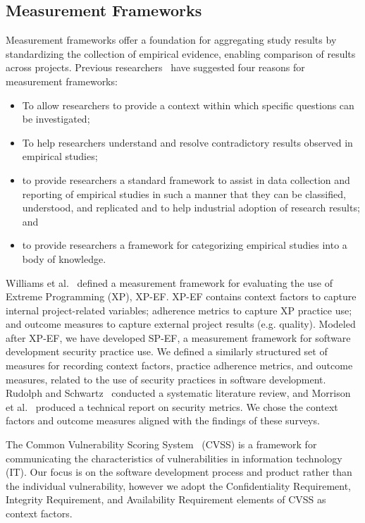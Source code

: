 \subsection{Measurement Frameworks}
Measurement frameworks offer a foundation for aggregating study results by standardizing the collection of empirical evidence, enabling comparison of results across projects. Previous researchers~\cite{kitchenham1999towards,williams2004toward} have suggested four reasons for measurement frameworks:
\begin{itemize}
	\item To allow researchers to provide a context within which specific questions can be investigated;
	\item To help researchers understand and resolve contradictory results observed in empirical studies;
	\item to provide researchers a standard framework to assist in data collection and reporting of empirical studies in such a manner that they can be classified, understood, and replicated and to help industrial adoption of research results; and
	\item  to provide researchers a framework for categorizing empirical studies into a body of knowledge.
\end{itemize}

Williams et al.~\cite{williams2004toward} defined a measurement framework for evaluating the use of Extreme Programming (XP), XP-EF. XP-EF contains context factors to capture internal project-related variables; adherence metrics to capture XP practice use; and outcome measures to capture external project results (e.g. quality). Modeled after XP-EF, we have developed SP-EF, a measurement framework for software development security practice use. We defined a similarly structured set of measures for recording context factors, practice adherence metrics, and outcome measures, related to the use of security practices in software development.
Rudolph and Schwartz~\cite{rudolph2012critical} conducted a systematic literature review, and Morrison et al.~\cite{morrison2014mapping} produced a technical report on security metrics. We chose the context factors and outcome measures aligned with the findings of these surveys.

The Common Vulnerability Scoring System~\cite{mell2006common} (CVSS) is a framework for communicating the characteristics of vulnerabilities in information technology (IT). Our focus is on the software development process and product rather than the individual vulnerability, however we adopt the Confidentiality Requirement, Integrity Requirement, and Availability Requirement elements of CVSS as context factors.
